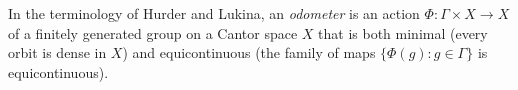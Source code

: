 
In the terminology of Hurder and Lukina, an \emph{odometer} is an action $\Phi:\Gamma\times X\to X$ of a finitely generated group on a Cantor space $X$ that is both minimal (every orbit is dense in $X$) and equicontinuous (the family of maps $\{\Phi(g):g\in\Gamma\}$ is equicontinuous).
